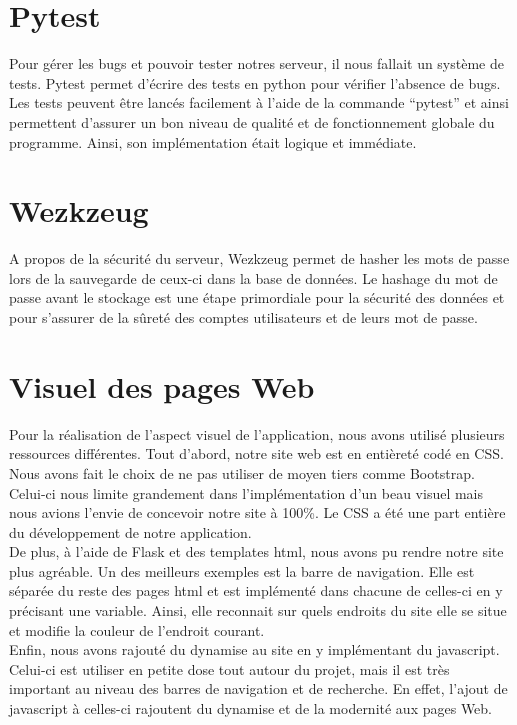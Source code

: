 \documentclass[12pt,titlepage]{report}
\begin{document}
\section{Pytest}

Pour gérer les bugs et pouvoir tester notres serveur, il nous fallait un système de tests. Pytest permet d’écrire des tests en python pour vérifier l’absence de bugs. Les tests peuvent être lancés facilement à l’aide de la commande “pytest” et ainsi permettent d’assurer un bon niveau de qualité et de fonctionnement globale du programme. Ainsi, son implémentation était logique et immédiate.

\section{Wezkzeug}

A propos de la sécurité du serveur, Wezkzeug permet de hasher les mots de passe lors de la sauvegarde de ceux-ci dans la base de données. Le hashage du mot de passe avant le stockage est une étape primordiale pour la sécurité des données et pour s’assurer de la sûreté des comptes utilisateurs et de leurs mot de passe.

\section{Visuel des pages Web}
Pour la réalisation de l’aspect visuel de l’application, nous avons utilisé plusieurs ressources différentes. Tout d’abord, notre site web est en entièreté codé en CSS. Nous avons fait le choix de ne pas utiliser de moyen tiers comme Bootstrap. Celui-ci nous limite grandement dans l’implémentation d’un beau visuel mais nous avions l’envie de concevoir notre site à 100\%. Le CSS a été une part entière du développement de notre application. \\

De plus, à l’aide de Flask et des templates html, nous avons pu rendre notre site plus agréable. Un des meilleurs exemples est la barre de navigation. Elle est séparée du reste des pages html et est implémenté dans chacune de celles-ci en y précisant une variable. Ainsi, elle reconnait sur quels endroits du site elle se situe et modifie la couleur de l’endroit courant. \\

Enfin, nous avons rajouté du dynamise au site en y implémentant du javascript. Celui-ci est utiliser en petite dose tout autour du projet, mais il est très important au niveau des barres de navigation et de recherche. En effet, l’ajout de javascript à celles-ci rajoutent du dynamise et de la modernité aux pages Web. 
\end{document}
